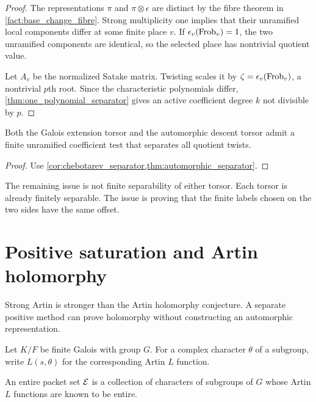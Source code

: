 \begin{proof}
The representations \(\pi\) and \(\pi\otimes\epsilon\) are distinct by the fibre theorem in \cref{fact:base_change_fibre}. Strong multiplicity one implies that their unramified local components differ at some finite place \(v\). If \(\epsilon_v(\operatorname{Frob}_v)=1\), the two unramified components are identical, so the selected place has nontrivial quotient value.

Let \(A_v\) be the normalized Satake matrix. Twisting scales it by \(\zeta=\epsilon_v(\operatorname{Frob}_v)\), a nontrivial \(p\)th root. Since the characteristic polynomials differ, \cref{thm:one_polynomial_separator} gives an active coefficient degree \(k\) not divisible by \(p\).
\end{proof}

\begin{corollary}\label{cor:both_torsor_separators}
Both the Galois extension torsor and the automorphic descent torsor admit a finite unramified coefficient test that separates all quotient twists.
\end{corollary}

\begin{proof}
Use \cref{cor:chebotarev_separator,thm:automorphic_separator}.
\end{proof}

\begin{remark}\label{rem:separator_offset}
The remaining issue is not finite separability of either torsor. Each torsor is already finitely separable. The issue is proving that the finite labels chosen on the two sides have the same offset.
\end{remark}

\section{Positive saturation and Artin holomorphy}\label{sec:positive_cone}

Strong Artin is stronger than the Artin holomorphy conjecture. A separate positive method can prove holomorphy without constructing an automorphic representation.

Let \(K/F\) be finite Galois with group \(G\). For a complex character \(\theta\) of a subgroup, write \(L(s,\theta)\) for the corresponding Artin \(L\) function.

\begin{definition}\label{def:entire_packet_set}
An entire packet set \(\mathcal E\) is a collection of characters of subgroups of \(G\) whose Artin \(L\) functions are known to be entire.
\end{definition}

